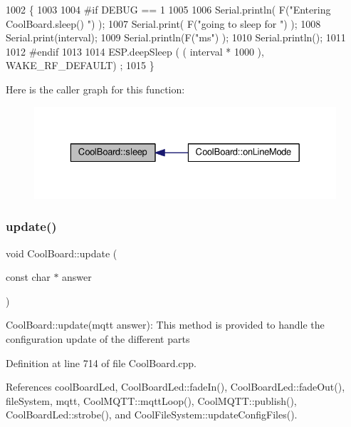 \begin{DoxyCode}
1002 \{
1003 
1004 \textcolor{preprocessor}{#if DEBUG == 1}
1005 
1006     Serial.println( F(\textcolor{stringliteral}{"Entering CoolBoard.sleep() "}) );
1007     Serial.print( F(\textcolor{stringliteral}{"going to sleep for "}) );
1008     Serial.print(interval);
1009     Serial.println(F(\textcolor{stringliteral}{"ms"}) );
1010     Serial.println();
1011 
1012 \textcolor{preprocessor}{#endif}
1013 
1014     ESP.deepSleep ( ( interval * 1000 ), WAKE\_RF\_DEFAULT) ;
1015 \}
\end{DoxyCode}
Here is the caller graph for this function\+:\nopagebreak
\begin{figure}[H]
\begin{center}
\leavevmode
\includegraphics[width=329pt]{classCoolBoard_a5d0c8ff93b615efd676be432de9f164a_icgraph}
\end{center}
\end{figure}
\mbox{\label{classCoolBoard_a8612756d3f73198cdde857a66f0fe690}} 
\subsubsection{\texorpdfstring{update()}{update()}}
{\footnotesize\ttfamily void Cool\+Board\+::update (\begin{DoxyParamCaption}\item[{const char $\ast$}]{answer }\end{DoxyParamCaption})}

Cool\+Board\+::update(mqtt answer)\+: This method is provided to handle the configuration update of the different parts 

Definition at line 714 of file Cool\+Board.\+cpp.



References cool\+Board\+Led, Cool\+Board\+Led\+::fade\+In(), Cool\+Board\+Led\+::fade\+Out(), file\+System, mqtt, Cool\+M\+Q\+T\+T\+::mqtt\+Loop(), Cool\+M\+Q\+T\+T\+::publish(), Cool\+Board\+Led\+::strobe(), and Cool\+File\+System\+::update\+Config\+Files().



